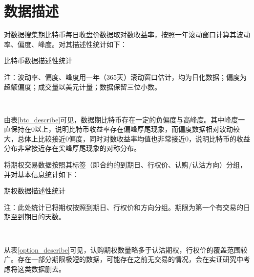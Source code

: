 \section{数据描述}\label{data_describe}
    \par{
        对数据搜集期比特币每日收盘价数据取对数收益率，按照一年滚动窗口计算其波动率、偏度、峰度。对其描述性统计如下：}

        \begin{threeparttable}[H]
            
            \centering
            \caption{比特币数据描述性统计}
            \label{btc_describe}
            
            \begin{tablenotes}
                \footnotesize
                \item 注：波动率、偏度、峰度用一年（365天）滚动窗口估计，均为日化数据；偏度为超额偏度；成交量以美元计量；数据保留三位小数。
            \end{tablenotes}
        \end{threeparttable}
        
    
    ~\\
    \par{
        
        由表\ref{btc_describe}可见，数据期比特币存在一定的负偏度与高峰度。其中峰度一直保持在0以上，说明比特币收益率存在偏峰厚尾现象，而偏度数据相对波动较大，总体上比较接近0偏度，同时对数收益率均值也非常接近0，说明比特币的收益分布非常接近存在尖峰厚尾现象的对称分布。
    }
    \newpage
    \par{
        将期权交易数据按照其标签（即合约的到期日、行权价、认购/认沽方向）分组，并对基本信息统计如下：
    }
    \par{
    \begin{threeparttable}[H]
        \centering
        \caption{期权数据描述性统计}
        \label{option_describe}
        
        \begin{tablenotes}
            \footnotesize
            \item 注：此处统计已将期权按照到期日、行权价和方向分组。期限为第一个有交易的日期至到期日的天数。
        \end{tablenotes}
    \end{threeparttable}
    }
    ~\\
    \par{
    从表\ref{option_describe}可见，认购期权数量略多于认沽期权，行权价的覆盖范围较广。存在一部分期限极短的数据，可能存在之前无交易的情况，会在实证研究中考虑将这类数据删去。
    }